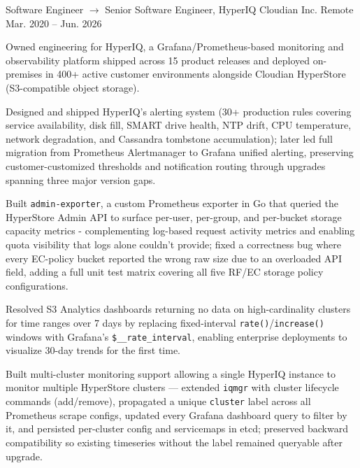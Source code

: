 
\begin{cventries}

  \cventry
    {Software Engineer $\to$ Senior Software Engineer, HyperIQ}
    {Cloudian Inc.}
    {Remote}
    {Mar. 2020 -- Jun. 2026}
    {
      \begin{cvitems}
        \item {Owned engineering for HyperIQ, a Grafana/Prometheus-based monitoring and observability platform shipped across 15 product releases and deployed on-premises in 400+ active customer environments alongside Cloudian HyperStore (S3-compatible object storage).}
        \item {Designed and shipped HyperIQ's alerting system (30+ production rules covering service availability, disk fill, SMART drive health, NTP drift, CPU temperature, network degradation, and Cassandra tombstone accumulation); later led full migration from Prometheus Alertmanager to Grafana unified alerting, preserving customer-customized thresholds and notification routing through upgrades spanning three major version gaps.}
        \item {Built \texttt{admin-exporter}, a custom Prometheus exporter in Go that queried the HyperStore Admin API to surface per-user, per-group, and per-bucket storage capacity metrics - complementing log-based request activity metrics and enabling quota visibility that logs alone couldn't provide; fixed a correctness bug where every EC-policy bucket reported the wrong raw size due to an overloaded API field, adding a full unit test matrix covering all five RF/EC storage policy configurations.}
        \item {Resolved S3 Analytics dashboards returning no data on high-cardinality clusters for time ranges over 7 days by replacing fixed-interval \texttt{rate()}/\texttt{increase()} windows with Grafana's \texttt{\$\_\_rate\_interval}, enabling enterprise deployments to visualize 30-day trends for the first time.}
        \item {Built multi-cluster monitoring support allowing a single HyperIQ instance to monitor multiple HyperStore clusters — extended \texttt{iqmgr} with cluster lifecycle commands (add/remove), propagated a unique \texttt{cluster} label across all Prometheus scrape configs, updated every Grafana dashboard query to filter by it, and persisted per-cluster config and servicemaps in etcd; preserved backward compatibility so existing timeseries without the label remained queryable after upgrade.}

\end{cvitems}}
\end{cventries}
